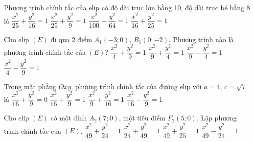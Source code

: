 \begin{ex}%
	Phương trình chính tắc của elip có  độ dài trục lớn bằng 10, độ dài trục bé bằng 8 là
	\choice 
		{\True  $\dfrac{x^2}{25}+\dfrac{y^2}{16}=1$}
		{$\dfrac{x^2}{25}+\dfrac{y^2}{9}=1$} 
		 {$\dfrac{x^2}{100}+\dfrac{y^2}{64}=1$}
		 {$\dfrac{x^2}{16}+\dfrac{y^2}{25}=1$}
\end{ex}

\begin{ex}%
	Cho elip $(E)$ đi qua  $2$ điểm $A_1(-3;0)$, $B_1(0;-2)$. Phương trình nào là phương trình chính tắc của $(E)$?
	 \choice
		 {$\dfrac{x^2}{4}+\dfrac{y^2}{9}=1$}
		{\True $\dfrac{x^2}{9}+\dfrac{y^2}{4}=1$} 
		{$\dfrac{x^2}{9}-\dfrac{y^2}{4}=1$} 
		 {$\dfrac{x^2}{4}-\dfrac{y^2}{9}=1$}
\end{ex}

\begin{ex}%
	Trong mặt phẳng $Oxy$, phương trình chính tắc của đường  elip với $a=4$, $c=\sqrt{7}$ là
	 \choice
		 {$\dfrac{x^2}{16}+\dfrac{y^2}{9}=0$}
		 {\True $\dfrac{x^2}{16}+\dfrac{y^2}{9}=1$}
		{$\dfrac{x^2}{9}+\dfrac{y^2}{16}=1$} 
		{$\dfrac{x^2}{16}-\dfrac{y^2}{9}=1$} 
\end{ex}

\begin{ex}%
	Cho elip $(E)$ có một đỉnh $A_2(7;0)$, một tiêu điểm $F_2(5;0)$. Lập phương trình  chính tắc của $(E)$.
	 \choice
		{ \True $\dfrac{x^2}{49}+\dfrac{y^2}{24}=1$} 
		 {$\dfrac{x^2}{24}+\dfrac{y^2}{49}=1$}
		{  $\dfrac{x^2}{49}+\dfrac{y^2}{25}=1$}
		{$\dfrac{x^2}{49}-\dfrac{y^2}{24}=1$} 
\end{ex}

